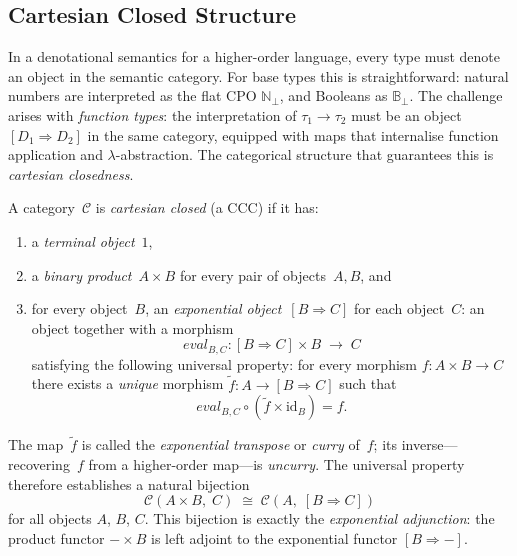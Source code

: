 \subsection{Cartesian Closed Structure}
\label{sec:bg-ccc}

In a denotational semantics for a higher-order language, every type must
denote an object in the semantic category.  For base types this is
straightforward: natural numbers are interpreted as the flat CPO
$\mathbb{N}_\bot$, and Booleans as $\mathbb{B}_\bot$.  The challenge
arises with \emph{function types}: the interpretation of
$\tau_1 \to \tau_2$ must be an object~$[D_1 \Rightarrow D_2]$ in the
same category, equipped with maps that internalise function application
and $\lambda$-abstraction.  The categorical structure that guarantees
this is \emph{cartesian closedness}.

\begin{definition}
\label{def:ccc}
A category~$\mathcal{C}$ is \emph{cartesian closed} (a CCC) if it has:
\begin{enumerate}
  \item a \emph{terminal object}~$1$,
  \item a \emph{binary product}~$A \times B$ for every pair of
        objects~$A, B$, and
  \item for every object~$B$, an \emph{exponential
        object}~$[B \Rightarrow C]$ for each object~$C$: an
        object together with a morphism
        \[
            \mathit{eval}_{B,C} : [B \Rightarrow C] \times B
              \;\longrightarrow\; C
        \]
        satisfying the following universal property: for every morphism
        $f : A \times B \to C$ there exists a \emph{unique} morphism
        $\widetilde{f} : A \to [B \Rightarrow C]$ such that
        \[
            \mathit{eval}_{B,C} \circ (\widetilde{f} \times \mathrm{id}_B)
              = f.
        \]
\end{enumerate}
\end{definition}

The map~$\widetilde{f}$ is called the \emph{exponential transpose} or
\emph{curry} of~$f$; its inverse---recovering~$f$ from a
higher-order map---is \emph{uncurry}.  The universal property therefore
establishes a natural bijection
\[
    \mathcal{C}(A \times B,\; C)
      \;\cong\;
    \mathcal{C}(A,\; [B \Rightarrow C])
\]
for all objects $A$, $B$, $C$.  This bijection is exactly the
\emph{exponential adjunction}: the product functor $- \times B$ is left
adjoint to the exponential functor $[B \Rightarrow -]$.

